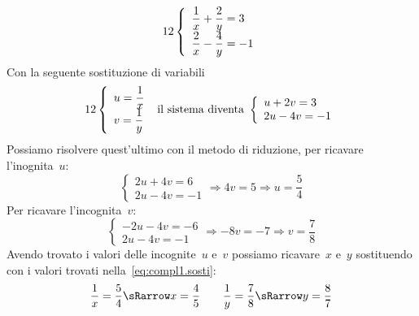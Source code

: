  \begin{esempio}{}{}
\[\arraystretch{2}\left\{\begin{array}{l}
  \dfrac{1}{x}+\dfrac{2}{y}=3\\
  \dfrac{2}{x}-\dfrac{4}{y}=-1 
\end{array}\right.\]
Con la seguente sostituzione di variabili
\label{eq:compl1.sosti}
\[\arraystretch{2}\left\{\begin{array}{l}
  u=\dfrac{1}{x}\\
  v=\dfrac{1}{y}
\end{array}\right.
 \text{ il sistema diventa }
\left\{\begin{array}{l}
  u+2v=3 \\
  2u-4v=-1 
\end{array}\right.\]
Possiamo risolvere quest'ultimo con il metodo di riduzione, 
per ricavare l'inognita~\(u\):
\[\left\{\begin{array}{l}
2u+4v=6 \\
2u-4v=-1
\end{array}\right. \Rightarrow 4v=5 \Rightarrow u=\frac{5}{4}\]
Per ricavare l'incognita~\(v\):
\[\left\{\begin{array}{l}
-2u-4v=-6 \\
2u-4v=-1 \end{array}\right. \Rightarrow -8v=-7 \Rightarrow v=\frac{7}{8}\]
Avendo trovato i valori delle incognite~\(u\) e~\(v\) possiamo 
ricavare~\(x\) 
e~\(y\) sostituendo con i valori trovati nella~\ref{eq:compl1.sosti}:
\[\dfrac{1}{x}=\dfrac{5}{4} \sRarrow x=\dfrac{4}{5} \qquad
  \dfrac{1}{y}=\dfrac{7}{8} \sRarrow y=\dfrac{8}{7}\]
 \end{esempio}

